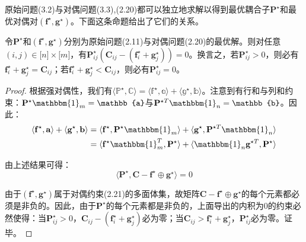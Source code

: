\documentclass[cn,10pt,math=newtx,citestyle=gb7714-2015,bibstyle=gb7714-2015]{elegantbook}
\begin{document}
原始问题(3.2)与对偶问题(3.3),(2.20)都可以独立地求解以得到最优耦合子$\mathbf{P}^\star$和最优对偶对$(\mathbf{f}^\star,\mathbf{g}^\star)$。下面这条命题给出了它们的关系。

\begin{proposition}
令$\mathbf{P}^\star$和$(\mathbf{f}^\star,\mathbf{g}^\star)$分别为原始问题(2.11)与对偶问题(2.20)的最优解。则对任意$(i,j)\in\mathbb{[}n\mathbb{]}\times \mathbb{[}m\mathbb{]}$，有$\mathbf{P}^\star_{ij}\left(\mathbf{C}_{ij}-\left( \mathbf{f}_i^\star + \mathbf{g}_j^\star \right)\right)=0$。换言之，若$\mathbf{P}_{ij}^\star>0$，则必有$\mathbf{f}_i^\star+\mathbf{g}_j^\star = \mathbf{C}_{ij}$；若$\mathbf{f}_i^\star+\mathbf{g}_j^\star < \mathbf{C}_{ij}$，则必有$\mathbf{P}_{ij}^\star=0$。
\end{proposition}

\begin{proof}
根据强对偶性，我们有$\langle \mathbb{P}^\star,\mathbb{C}\rangle = \langle \mathbb{f}^\star,\mathbb{a}\rangle + \langle \mathbb{g}^\star,\mathbb{b} \rangle$。注意到有行和与列和约束：$\mathbf{P}^\star\mathbbm{1}_m=\mathbb{a}$与$\mathbf{P}^{\star T}\mathbbm{1}_n=\mathbb{b}$。因此：
\begin{align*}
    \langle \mathbf{f}^\star,\mathbf{a}\rangle + \langle \mathbf{g}^\star,\mathbf{b} \rangle &= \langle \mathbf{f}^\star,\mathbf{P}^\star\mathbbm{1}_m\rangle + \langle \mathbf{g}^\star,\mathbf{P}^{\star T}\mathbbm{1}_n \rangle \\
    &= \langle \mathbf{f}^\star\mathbbm{1}_m^T,\mathbf{P}^\star \rangle + \langle \mathbbm{1}_n\mathbf{g}^{\star T},\mathbf{P}^{\star} \rangle
\end{align*}

由上述结果可得：
\begin{equation*}
    \langle \mathbf{P}^\star, \mathbf{C}-\mathbf{f}^\star \oplus \mathbf{g}^\star \rangle = 0
\end{equation*}

由于$(\mathbf{f}^\star, \mathbf{g}^\star)$属于对偶约束(2.21)的多面体集，故矩阵$\mathbf{C}-\mathbf{f}^\star \oplus \mathbf{g}^\star$的每个元素都必须是非负的。因此，由于$\mathbf{P}^\star$的每个元素都是非负的，上面导出的内积为0的约束必然使得：当$\mathbf{P}_{ij}^\star>0$，$\mathbf{C}_{ij}-(\mathbf{f}_i^\star+\mathbf{g}_j^\star)$必为零；当$\mathbf{C}_{ij}>\mathbf{f}_i^\star+\mathbf{g}_j^\star$，$\mathbf{P}_{ij}^\star$必为零。证毕。
\end{proof}

\vspace{1.5em}
\end{document}
